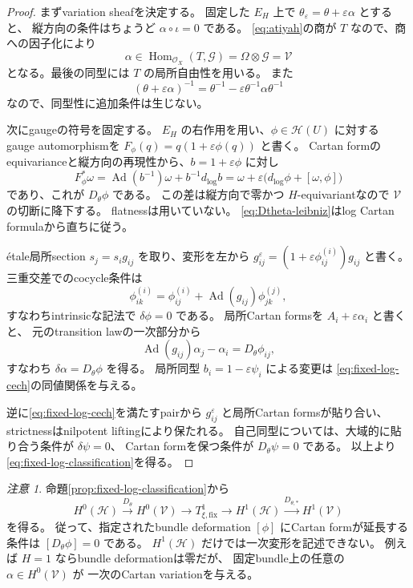 \documentclass[uplatex,dvipdfmx,11pt]{jsarticle}
\numberwithin{equation}{section}
\theoremstyle{plain}
\theoremstyle{definition}
\theoremstyle{remark}
\newtheorem{remark}[theorem]{注意}
\DeclareMathOperator{\Ad}{Ad}
\DeclareMathOperator{\Hom}{Hom}
\newcommand{\OO}{\mathcal O}
\newcommand{\shH}{\mathcal H}
\newcommand{\shG}{\mathcal G}
\newcommand{\shV}{\mathcal V}
\begin{document}
\begin{proof}
まずvariation sheafを決定する。
固定した \(E_H\) 上で \(\theta_\varepsilon=\theta+\varepsilon\alpha\) とすると、
縦方向の条件はちょうど \(\alpha\circ\iota=0\) である。
\eqref{eq:atiyah}の商が \(T\) なので、商への因子化により
\[
\alpha\in\Hom_{\OO_X}(T,\shG)=\Omega\otimes\shG=\shV
\]
となる。最後の同型には \(T\) の局所自由性を用いる。
また
\[
(\theta+\varepsilon\alpha)^{-1}=\theta^{-1}-\varepsilon\theta^{-1}\alpha\theta^{-1}
\]
なので、同型性に追加条件は生じない。

次にgaugeの符号を固定する。
\(E_H\) の右作用を用い、\(\phi\in\shH(U)\) に対する
gauge automorphismを \(F_\phi(q)=q(1+\varepsilon\phi(q))\) と書く。
Cartan formのequivarianceと縦方向の再現性から、\(b=1+\varepsilon\phi\) に対し
\[
F_\phi^*\omega=\Ad(b^{-1})\omega+b^{-1}d_{\log}b
=\omega+\varepsilon\bigl(d_{\log}\phi+[\omega,\phi]\bigr)
\]
であり、これが \(D_\theta\phi\) である。
この差は縦方向で零かつ \(H\)-equivariantなので \(\shV\) の切断に降下する。
flatnessは用いていない。
\eqref{eq:Dtheta-leibniz}はlog Cartan formulaから直ちに従う。

étale局所section \(s_j=s_ig_{ij}\) を取り、変形を左から
\(g_{ij}^\varepsilon=(1+\varepsilon\phi_{ij}^{(i)})g_{ij}\) と書く。
三重交差でのcocycle条件は
\[
\phi_{ik}^{(i)}=\phi_{ij}^{(i)}+\Ad(g_{ij})\phi_{jk}^{(j)},
\]
すなわちintrinsicな記法で \(\delta\phi=0\) である。
局所Cartan formsを \(A_i+\varepsilon\alpha_i\) と書くと、
元のtransition lawの一次部分から
\[
\Ad(g_{ij})\alpha_j-\alpha_i=D_\theta\phi_{ij},
\]
すなわち \(\delta\alpha=D_\theta\phi\) を得る。
局所同型 \(b_i=1-\varepsilon\psi_i\) による変更は
\eqref{eq:fixed-log-cech}の同値関係を与える。

逆に\eqref{eq:fixed-log-cech}を満たすpairから
\(g_{ij}^\varepsilon\) と局所Cartan formsが貼り合い、
strictnessはnilpotent liftingにより保たれる。
自己同型については、大域的に貼り合う条件が \(\delta\psi=0\)、
Cartan formを保つ条件が \(D_\theta\psi=0\) である。
以上より\eqref{eq:fixed-log-classification}を得る。
\end{proof}

\begin{remark}
\label{rem:bundle-only-insufficient}
命題\ref{prop:fixed-log-classification}から
\[
H^0(\shH)\xrightarrow{D_\theta}H^0(\shV)
\longrightarrow T^1_{\xi,\mathrm{fix}}
\longrightarrow H^1(\shH)
\xrightarrow{D_{\theta,*}}H^1(\shV)
\]
を得る。
従って、指定されたbundle deformation \([\phi]\) にCartan formが延長する条件は
\([D_\theta\phi]=0\) である。
\(H^1(\shH)\) だけでは一次変形を記述できない。
例えば \(H=1\) ならbundle deformationは零だが、
固定bundle上の任意の \(\alpha\in H^0(\shV)\) が
一次のCartan variationを与える。
\end{remark}
\end{document}
